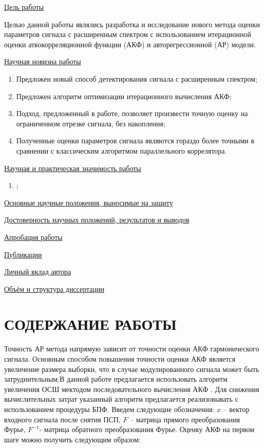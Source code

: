 \underline{Цель работы}

Целью данной работы являлись разработка и исследование нового метода оценки параметров сигнала с расширенным спектром с использованием
итерационной оценки атвокорреляционной функции (АКФ) и авторегрессионной (АР) модели.

\underline{Научная новизна работы}
\begin{enumerate}
      \item {Предложен новый способ детектирования сигнала с расширенным спектром;}
      \item {Предложен алгоритм оптимизации итерационного вычисления АКФ;}
      \item {Подход, предложенный в работе, позволяет произвести точную оценку на ограниченном отрезке сигнала, без накопления;}
      \item {Полученные оценки параметров сигнала являются гораздо более точными в сравнении с классическим алгоритмом
      		параллельного коррелятора.}
\end{enumerate}

\underline{Научная и практическая значимость работы}
\begin{enumerate}
      \item {;}
\end{enumerate}

\underline{Основные научные положения, выносимые на защиту}

\underline{Достоверность научных положений, результатов и выводов}

\underline{Апробация работы}

\underline{Публикации}

\underline{Личный вклад автора}

\underline{Объём и структура диссертации}

\section*{СОДЕРЖАНИЕ РАБОТЫ}



Точность АР метода напрямую зависит от точности оценки АКФ гармонического сигнала. Основным способом повышения точности оценки АКФ является увеличение размера выборки,
что в случае модулированного сигнала может быть затруднительным.В данной работе предлагается использовать алгоритм увеличения ОСШ мектодом последовательного вычисления
АКФ \cite{ostanin_akf}. Для снижения вычислительных затрат указанный алгоритм предлагается реализовывать с использованием процедуры БПФ. 
Введем следующие обозначения: ${x}$ – вектор входного сигнала после снятия ПСП, ${F}$ – матрица прямого преобразования Фурье, ${F^{-1}}$- матрица обратного преобразования Фурье.
Оценку АКФ на первом шаге можно получить следующим образом:

